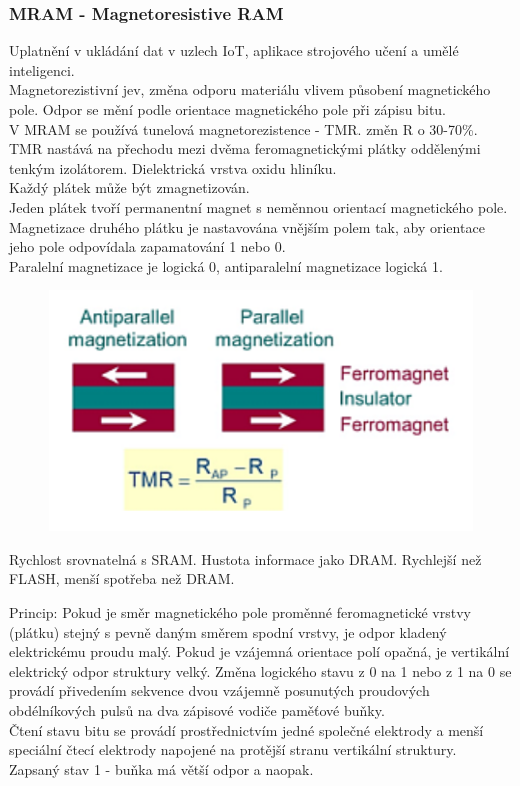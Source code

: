 \subsubsection*{MRAM - Magnetoresistive RAM}
Uplatnění v ukládání dat v uzlech IoT, aplikace strojového učení a umělé inteligenci.\\
Magnetorezistivní jev, změna odporu materiálu vlivem působení magnetického pole. Odpor se mění podle orientace magnetického pole při zápisu bitu.\\
V MRAM se používá tunelová magnetorezistence - TMR. změn R o 30-70\%.\\
TMR nastává na přechodu mezi dvěma feromagnetickými plátky oddělenými tenkým izolátorem. Dielektrická vrstva oxidu hliníku.\\
Každý plátek může být zmagnetizován. \\
Jeden plátek tvoří permanentní magnet s neměnnou orientací magnetického pole.\\
Magnetizace druhého plátku je nastavována vnějším polem tak, aby orientace jeho pole odpovídala zapamatování 1 nebo 0.\\
Paralelní magnetizace je logická 0, antiparalelní magnetizace logická 1.

\begin{figure}[h!]
    \centering
    \includegraphics[scale = 0.5]{img/MRAM.png}
\end{figure}

Rychlost srovnatelná s SRAM. Hustota informace jako DRAM. Rychlejší než FLASH, menší spotřeba než DRAM.

Princip: Pokud je směr magnetického pole proměnné feromagnetické vrstvy (plátku) stejný s pevně daným směrem spodní vrstvy, je odpor kladený elektrickému proudu malý. Pokud je vzájemná orientace polí opačná, je vertikální elektrický odpor struktury velký. Změna logického stavu z 0 na 1 nebo z 1 na 0 se provádí přivedením sekvence dvou vzájemně posunutých proudových obdélníkových pulsů na dva zápisové vodiče paměťové buňky.\\
Čtení stavu bitu se provádí prostřednictvím jedné společné elektrody a menší speciální čtecí elektrody napojené na protější stranu vertikální struktury.\\
Zapsaný stav 1 - buňka má větší odpor a naopak.\\

